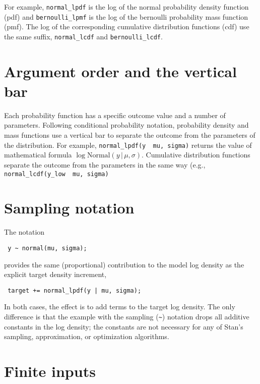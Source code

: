 \documentclass[
  10pt,
]{book}
\begin{document}
For example, \texttt{normal\_lpdf} is the log of the normal probability
density function (pdf) and \texttt{bernoulli\_lpmf} is the log of the
bernoulli probability mass function (pmf). The log of the
corresponding cumulative distribution functions (cdf) use the same
suffix, \texttt{normal\_lcdf} and \texttt{bernoulli\_lcdf}.

\hypertarget{argument-order-and-the-vertical-bar}{%
\section{Argument order and the vertical bar}\label{argument-order-and-the-vertical-bar}}

Each probability function has a specific outcome value and a number of
parameters. Following conditional probability notation, probability
density and mass functions use a vertical bar to separate the outcome
from the parameters of the distribution. For example, \texttt{normal\_lpdf(y\ \textbar{}\ mu,\ sigma)} returns the value of mathematical formula \(\log \text{Normal}(y \, | \, \mu, \sigma)\). Cumulative distribution
functions separate the outcome from the parameters in the same way
(e.g., \texttt{normal\_lcdf(y\_low\ \textbar{}\ mu,\ sigma)}

\hypertarget{sampling-notation}{%
\section{Sampling notation}\label{sampling-notation}}

The notation

\begin{verbatim}
 y ~ normal(mu, sigma);
\end{verbatim}

provides the same (proportional) contribution to the model log density
as the explicit target density increment,

\begin{verbatim}
 target += normal_lpdf(y | mu, sigma);
\end{verbatim}

In both cases, the effect is to add terms to the target log density.
The only difference is that the example with the sampling (\texttt{\textasciitilde{}})
notation drops all additive constants in the log density; the
constants are not necessary for any of Stan's sampling, approximation,
or optimization algorithms.

\hypertarget{finite-inputs}{%
\section{Finite inputs}\label{finite-inputs}}
\end{document}
